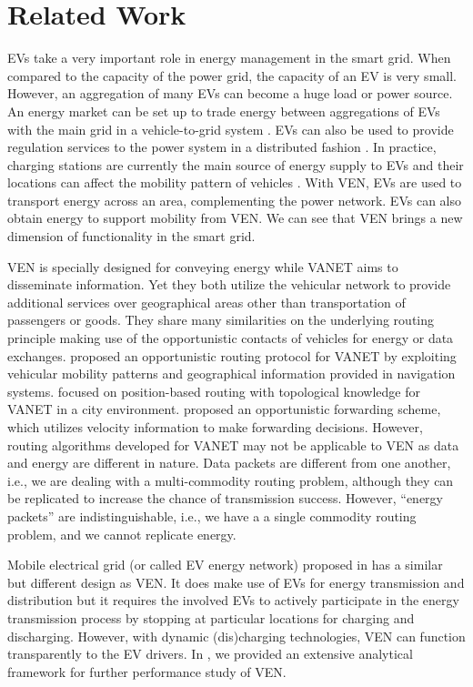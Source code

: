 \documentclass[journal]{IEEEtran}
\begin{document}
\section{Related Work} \label{sec:related}

EVs take a very important role in energy management in the smart grid. When compared to the capacity of the power grid, the capacity of an EV is very small. However, an aggregation of many EVs can become a huge load or power source. An energy market can be set up to trade energy between aggregations of EVs with the main grid in a vehicle-to-grid system \cite{V2GMarket}. EVs can also be used to provide regulation services to the power system in a distributed fashion \cite{regulation}. In practice, charging stations are currently the main source of energy supply to EVs and their locations can affect the mobility pattern of vehicles \cite{EVCPP}. With VEN, EVs are used to transport energy across an area,  complementing the power network. EVs can also obtain energy to support mobility from VEN. We can see that VEN brings a new dimension of functionality in the smart grid.


VEN is specially designed for conveying energy while VANET aims to disseminate information.  Yet they both utilize the vehicular network to provide additional services over geographical areas other than transportation of  passengers or goods. They share many similarities on the underlying routing principle making use of the opportunistic contacts of vehicles for energy or data exchanges. 
\cite{geopps} proposed an opportunistic routing protocol for VANET by exploiting vehicular mobility patterns and geographical information provided in navigation systems.
\cite{Greedy} focused on position-based routing with topological knowledge for VANET in a city environment.
\cite{Move} proposed an opportunistic forwarding scheme, which utilizes velocity information to make forwarding decisions.
However, routing algorithms developed for VANET may not be applicable to VEN as data and energy are different in nature. Data packets are different from one another, i.e., we are dealing with a multi-commodity routing problem, although they can be replicated to increase the chance of transmission success. However, ``energy packets'' are indistinguishable, i.e., we have a a single commodity routing problem, and we cannot replicate energy.


Mobile electrical grid (or called EV energy network) proposed in \cite{EVnetICC} has a similar but different design as VEN. It does make use of EVs for energy transmission and distribution but it requires the involved EVs to actively participate in the energy transmission process by stopping at particular locations for charging and discharging. However, with dynamic   (dis)charging technologies, VEN can function transparently to the EV drivers. In \cite{VEN}, we provided an extensive analytical framework for further performance study of VEN. 
\end{document}
